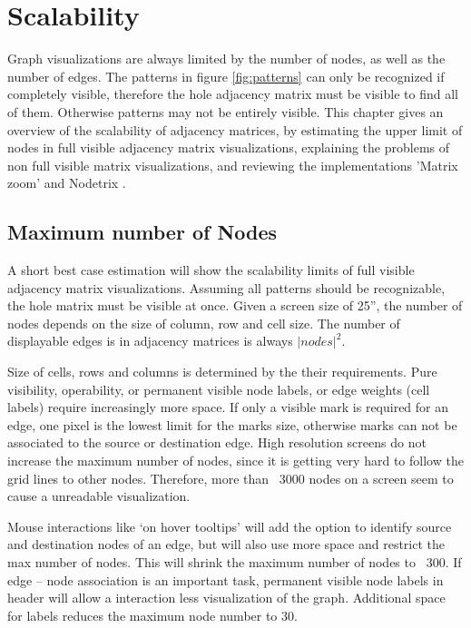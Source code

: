\chapter{Scalability}
\label{chap:Scalability}

Graph visualizations are always limited by the number of nodes, as well as the number of edges. The patterns in figure \ref{fig:patterns} can only be recognized if completely visible, therefore the hole adjacency matrix must be visible to find all of them. Otherwise patterns may not be entirely visible. This chapter gives an overview of the scalability of adjacency matrices, by estimating the upper limit of nodes in full visible adjacency matrix visualizations, explaining the problems of non full visible matrix visualizations, and reviewing the implementations 'Matrix zoom' \citep{ham-ivis-2003,abello2004} and Nodetrix \citep{henry-nodetrix-2007}.


\section{Maximum number of Nodes}
A short best case estimation will show the scalability limits of full visible adjacency matrix visualizations. Assuming all patterns should be recognizable, the hole matrix must be visible at once. Given a screen size of 25”, the number of nodes depends on the size of column, row and cell size. The number of displayable edges is in adjacency matrices is always $|nodes|^2$.

Size of cells, rows and columns is determined by the their requirements. Pure visibility, operability, or permanent visible node labels, or edge weights (cell labels) require increasingly more space.
If only a visible mark is required for an edge, one pixel is the lowest limit for the marks size, otherwise marks can not be associated to the source or destination edge. High resolution screens do not increase the maximum number of nodes, since it is getting very hard to follow the grid lines to other nodes. Therefore, more than ~3000 nodes on a screen seem to cause a unreadable visualization.

Mouse interactions like ‘on hover tooltips’ will add the option to identify source and destination nodes of an edge, but will also use more space and restrict the max number of nodes. This will shrink the maximum number of nodes to ~300.
If edge -- node association is an important task, permanent visible node labels in header will allow a interaction less visualization of the graph. Additional space for labels reduces the maximum node number to 30.
 
